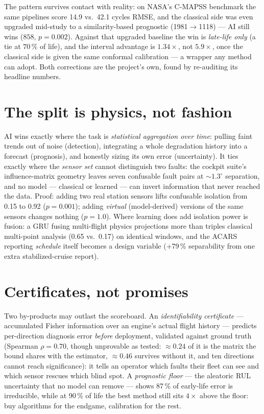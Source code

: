 \documentclass[11pt,twocolumn]{article}
\begin{document}
The pattern survives contact with reality: on NASA's C-MAPSS benchmark the same pipelines
score 14.9 vs.\ 42.1 cycles RMSE, and the classical side was even upgraded mid-study to a
similarity-based prognostic (1981${\to}$1118) --- AI still wins ($858$, $p{=}0.002$). Against
that upgraded baseline the win is \emph{late-life only} (a tie at $70\,\%$ of life), and the
interval advantage is $1.34\times$, not $5.9\times$, once the classical side is given the same
conformal calibration --- a wrapper any method can adopt. Both corrections are the project's
own, found by re-auditing its headline numbers.

\section{The split is physics, not fashion}
AI wins exactly where the task is \emph{statistical aggregation over time}: pulling faint
trends out of noise (detection), integrating a whole degradation history into a forecast
(prognosis), and honestly sizing its own error (uncertainty). It ties exactly where the
\emph{sensor set} cannot distinguish two faults: the cockpit suite's influence-matrix
geometry leaves seven confusable fault pairs at ${\sim}1.3^{\circ}$ separation, and no model
--- classical or learned --- can invert information that never reached the data. Proof:
adding two real station sensors lifts confusable isolation from 0.15 to 0.92
($p{=}0.001$); adding \emph{virtual} (model-derived) versions of the same sensors changes
nothing ($p{=}1.0$). Where learning does add isolation power is fusion: a GRU fusing
multi-flight physics projections more than triples classical multi-point analysis (0.65
vs.\ 0.17) on identical windows, and the ACARS reporting \emph{schedule} itself becomes a
design variable (+79\,\% separability from one extra stabilized-cruise report).

\section{Certificates, not promises}
Two by-products may outlast the scoreboard. An \emph{identifiability certificate} ---
accumulated Fisher information over an engine's actual flight history --- predicts
per-direction diagnosis error \emph{before} deployment, validated against ground truth
(Spearman $\rho{=}0.70$, though unprovable as tested: $\approx0.24$ of it is the matrix the
bound shares with the estimator, $\approx0.46$ survives without it, and ten directions cannot
reach significance): it tells an operator which faults their fleet can see and which
sensor rescues which blind spot. A \emph{prognostic floor} --- the aleatoric RUL
uncertainty that no model can remove --- shows 87\,\% of early-life error is irreducible,
while at 90\,\% of life the best method still sits $4\times$ above the floor: buy
algorithms for the endgame, calibration for the rest.
\end{document}
